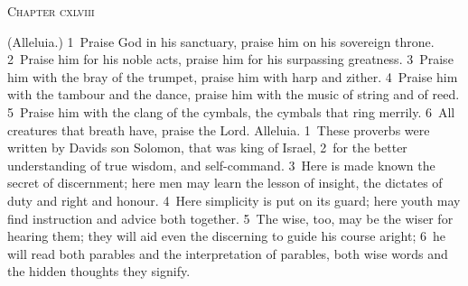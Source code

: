 \documentclass[10pt]{book} %
\begin{document}
\begin{large}\begin{center}\textsc{Chapter cxlviii}\end{center}\end{large}
(Alleluia.)
\textcolor{benred8}{1}~Praise God in his sanctuary, praise him on his sovereign throne. \textcolor{benred8}{2}~Praise him for his noble acts, praise him for his surpassing greatness. \textcolor{benred8}{3}~Praise him with the bray of the trumpet, praise him with harp and zither. \textcolor{benred8}{4}~Praise him with the tambour and the dance, praise him with the music of string and of reed. \textcolor{benred8}{5}~Praise him with the clang of the cymbals, the cymbals that ring merrily. \textcolor{benred8}{6}~All creatures that breath have, praise the Lord. Alleluia. \textcolor{benred8}{1}~These proverbs were written by David\textquotesingle s son Solomon, that was king of Israel, \textcolor{benred8}{2}~for the better understanding of true wisdom, and self-command. \textcolor{benred8}{3}~Here is made known the secret of discernment; here men may learn the lesson of insight, the dictates of duty and right and honour. \textcolor{benred8}{4}~Here simplicity is put on its guard; here youth may find instruction and advice both together. \textcolor{benred8}{5}~The wise, too, may be the wiser for hearing them; they will aid even the discerning to guide his course aright; \textcolor{benred8}{6}~he will read both parables and the interpretation of parables, both wise words and the hidden thoughts they signify.
\end{document}
